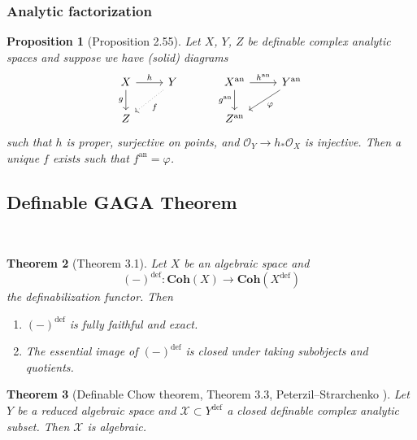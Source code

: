 \documentclass{amsart}
\newtheorem{theorem}{Theorem}[subsection]
\newtheorem{proposition}[theorem]{Proposition}
\theoremstyle{definition}
\numberwithin{equation}{section}
\newcommand{\definable}{\mathrm{def}}
\newcommand{\analytic}{\mathrm{an}}
\begin{document}
\subsubsection{Analytic factorization}
\begin{proposition}[Proposition 2.55] \label{analytic factorization}
  Let $X$, $Y$, $Z$ be definable complex analytic spaces and
  suppose we have (solid) diagrams
  \[
    \begin{tikzcd}
      X \ar[r,"h"] \ar[d,"g"'] & Y\ar[dl,"f",dotted] \\ Z
    \end{tikzcd}
    \hspace*{30pt}
    \begin{tikzcd}
      X^{\analytic} \ar[r,"h^{\analytic}"] \ar[d,"g^{\analytic}"'] & Y^{\analytic}\ar[dl,"\varphi"] \\ Z^{\analytic}
    \end{tikzcd}
  \]
  such that $h$ is proper, surjective on points,
  and $\mathcal{O}_Y \to h_*\mathcal{O}_X$ is injective.
  Then a unique $f$ exists such that $f^{\analytic} = \varphi$.
\end{proposition}

\subsection{Definable GAGA Theorem}~
\begin{tcolorbox}[title = {\Large Goal}]
  \begin{theorem}[Theorem 3.1]
    \label{def GAGA}
    Let $X$ be an algebraic space and
    \[(-)^{\definable} : \mathbf{Coh}(X) \to \mathbf{Coh}(X^{\definable})\]
    the definabilization functor.
    Then
    \begin{enumerate}[label = {(\arabic*)}]
      \item $(-)^{\definable}$ is fully faithful and exact.
      \item The essential image of $(-)^{\definable}$ is closed under taking subobjects and quotients.
    \end{enumerate}
  \end{theorem}
\end{tcolorbox}

\begin{theorem}[{Definable Chow theorem, Theorem 3.3, Peterzil--Strarchenko \cite[Corollary 4.5]{zbMATH05364146}}]
  Let $Y$ be a reduced algebraic space and
  $\mathcal{X} \subset Y^{\definable}$ a closed definable complex analytic subset.
  Then $\mathcal{X}$ is algebraic.
\end{theorem}
\end{document}
